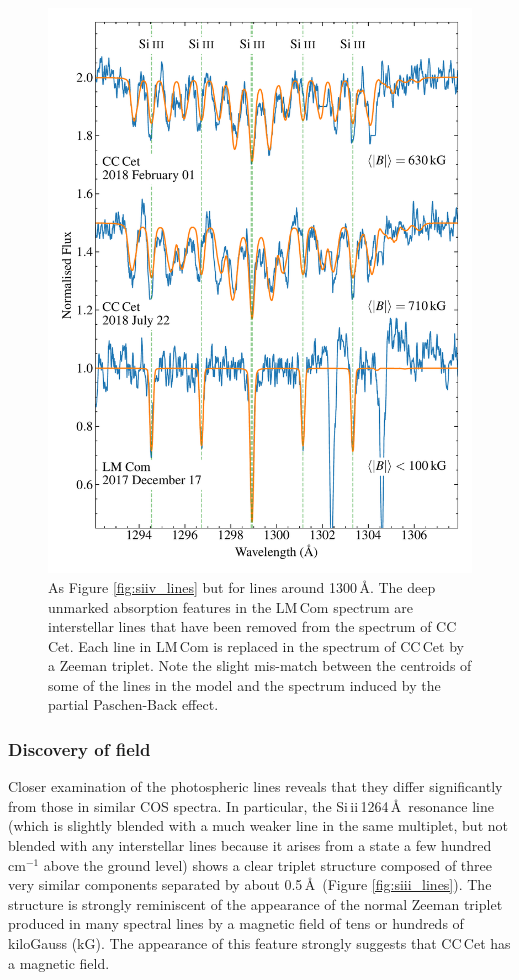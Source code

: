 \documentclass[fleqn,usenatbib]{mnras}
\begin{document}
\begin{figure}
    \centering
    \includegraphics[width=8 cm]{siiii_lines.pdf}
    \caption{As Figure \ref{fig:siiv_lines} but for  lines around 1300\,\AA. The deep unmarked absorption features in the LM\,Com spectrum are interstellar  lines that have been removed from the spectrum of CC\,Cet. Each line in LM\,Com is replaced in the spectrum of CC\,Cet by a Zeeman triplet. Note the slight mis-match between the centroids of some of the lines in the model and the spectrum induced by the partial Paschen-Back effect.}
    \label{fig:siiii_lines}
\end{figure}

\subsubsection{Discovery of field}

Closer examination of the photospheric lines reveals that they differ significantly from those in similar COS spectra. In particular, the Si\,{\sc ii}\,1264\,\AA\ resonance line (which is slightly blended with a much weaker line in the same multiplet, but not blended with any interstellar lines because it arises from a state a few hundred cm$^{-1}$ above the ground level) shows a clear triplet structure composed of three very similar components separated by about 0.5\,\AA\ (Figure \ref{fig:siii_lines}). The structure is strongly reminiscent of the appearance of the normal Zeeman triplet produced in many spectral lines by a magnetic field of tens or hundreds of kiloGauss (kG). The appearance of this feature strongly suggests that CC\,Cet has a magnetic field.  
\end{document}
